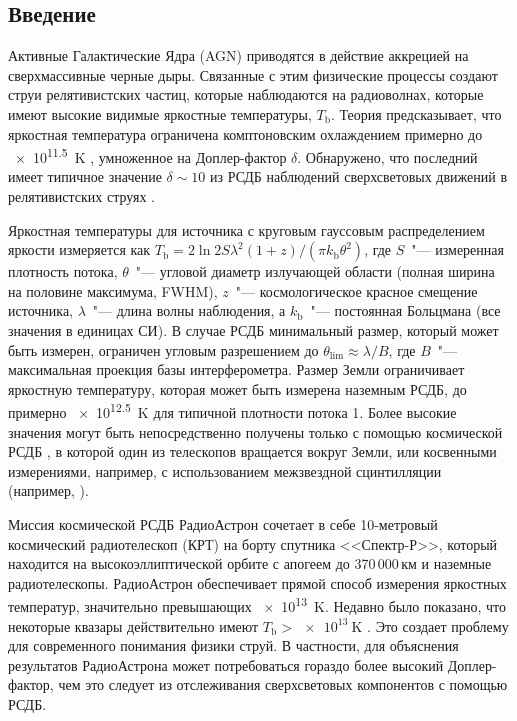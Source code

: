 \subsection{Введение}

Активные Галактические Ядра (AGN) приводятся в действие аккрецией на сверхмассивные черные дыры.
Связанные с этим физические процессы создают струи релятивистских частиц, которые наблюдаются на
радиоволнах, которые имеют высокие видимые яркостные температуры, $T_\text{b}$. Теория
предсказывает, что яркостная температура ограничена комптоновским охлаждением примерно до
\SI{e11.5}{\kelvin} \cite{Kellermann_1981,Readhead_1994}, умноженное на Доплер-фактор $\delta$.
Обнаружено, что последний имеет типичное значение $\delta \sim 10$ из РСДБ наблюдений
сверхсветовых движений в релятивистских струях \cite{Cohen_2007,Savolainen_2010,Lister_2013}.

Яркостная температуры для источника с круговым гауссовым распределением яркости измеряется как
$T_\text{b} = 2 \ln 2S\lambda^2 (1 + z) / (\pi k_\text{b} \theta^2)$, где $S$~"--- измеренная
плотность потока, $\theta$~"--- угловой диаметр излучающей области (полная ширина на половине
максимума, FWHM), $z$~"--- космологическое красное смещение источника, $\lambda$~"--- длина волны
наблюдения, а $k_\text{b}$~"--- постоянная Больцмана (все значения в единицах СИ). В случае РСДБ
минимальный размер, который может быть измерен, ограничен угловым разрешением до $\theta_\text{lim}
\approx \lambda / B$, где $B$~"--- максимальная проекция базы интерферометра. Размер Земли
ограничивает яркостную температуру, которая может быть измерена наземным РСДБ, до примерно
\SI{e12.5}{\kelvin} для типичной плотности потока \SI{1}{\jansky}. Более высокие значения могут
быть непосредственно получены только с помощью космической РСДБ \cite{Kovalev_2005}, в которой
один из телескопов вращается вокруг Земли, или косвенными измерениями, например, с использованием
межзвездной сцинтилляции (например, \cite{Lovell_2008}).

Миссия космической РСДБ РадиоАстрон сочетает в себе 10-метровый космический радиотелескоп (КРТ) на
борту спутника <<Спектр-Р>>, который находится на высокоэллиптической орбите с апогеем до
370\,000\,км \cite{Kardashev_2013_rus} и наземные радиотелескопы. РадиоАстрон обеспечивает
прямой способ измерения яркостных температур, значительно превышающих \SI{e13}{\kelvin}. Недавно
было показано, что некоторые квазары действительно имеют $T_\text{b} > \SI{e13}{\kelvin}$
\cite{Kovalev_2016,Gomez_2016}. Это создает проблему для современного понимания физики струй. В
частности, для объяснения результатов РадиоАстрона может потребоваться гораздо более высокий
Доплер-фактор, чем это следует из отслеживания сверхсветовых компонентов с помощью РСДБ.

